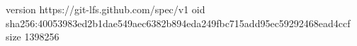 version https://git-lfs.github.com/spec/v1
oid sha256:40053983ed2b1dae549aec6382b894eda249fbc715add95ec59292468ead4ccf
size 1398256
